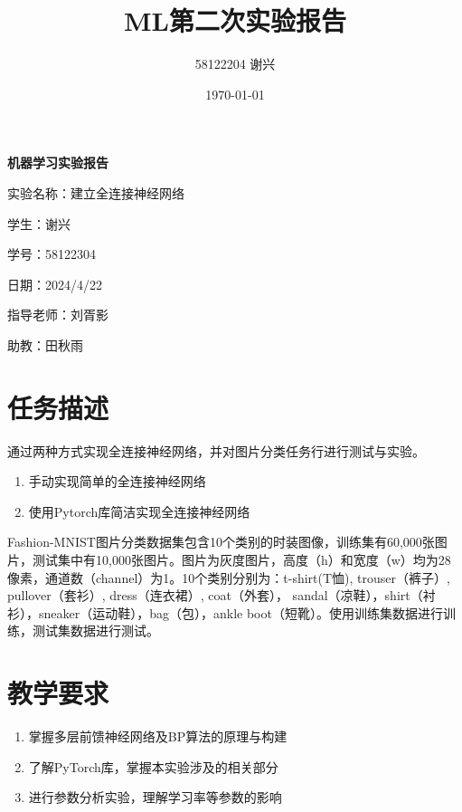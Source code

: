 \documentclass[12pt]{article}
\title{\textbf{ML第二次实验报告}}
\author{58122204 谢兴}
\date{\today}
\begin{document}
\begin{titlepage}
    \centering
    \vspace*{60pt}
    \Huge\textbf{机器学习实验报告}

    \vspace{100pt}
    \Large
    实验名称：建立全连接神经网络

    \vspace{25pt}
    学生：谢兴

    \vspace{25pt}
    学号：58122304

    \vspace{25pt}
    日期：2024/4/22

    \vspace{25pt}
    指导老师：刘胥影

    \vspace{25pt}
    助教：田秋雨



\end{titlepage}


\newpage
\tableofcontents
	

\section{任务描述}
通过两种方式实现全连接神经网络，并对图片分类任务行进行测试与实验。
\begin{enumerate}
    \item 手动实现简单的全连接神经网络
    \item 使用Pytorch库简洁实现全连接神经网络
\end{enumerate}

Fashion-MNIST图片分类数据集包含10个类别的时装图像，训练集有60,000张图片，测试集中有10,000张图片。图片为灰度图片，高度（h）和宽度（w）均为28像素，通道数（channel）为1。10个类别分别为：t-shirt(T恤), trouser（裤子）, pullover（套衫）, dress（连衣裙）, coat（外套）， sandal（凉鞋），shirt（衬衫），sneaker（运动鞋），bag（包），ankle boot（短靴）。使用训练集数据进行训练，测试集数据进行测试。
\section{教学要求}
\begin{enumerate}
    \item 掌握多层前馈神经网络及BP算法的原理与构建
    \item 了解PyTorch库，掌握本实验涉及的相关部分
    \item 进行参数分析实验，理解学习率等参数的影响
\end{enumerate}
\end{document}
